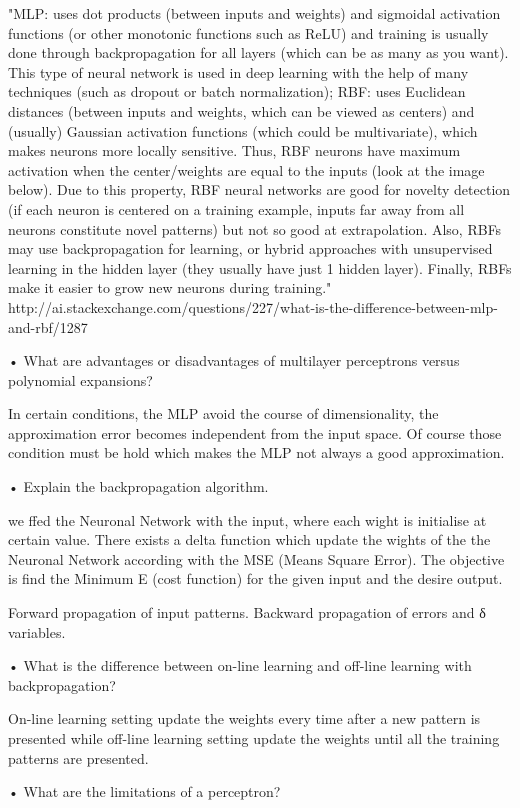 "MLP: uses dot products (between inputs and weights) and sigmoidal activation functions (or other monotonic functions such as ReLU) and training is usually done through backpropagation for all layers (which can be as many as you want). This type of neural network is used in deep learning with the help of many techniques (such as dropout or batch normalization);
RBF: uses Euclidean distances (between inputs and weights, which can be viewed as centers) and (usually) Gaussian activation functions (which could be multivariate), which makes neurons more locally sensitive. Thus, RBF neurons have maximum activation when the center/weights are equal to the inputs (look at the image below). Due to this property, RBF neural networks are good for novelty detection (if each neuron is centered on a training example, inputs far away from all neurons constitute novel patterns) but not so good at extrapolation. Also, RBFs may use backpropagation for learning, or hybrid approaches with unsupervised learning in the hidden layer (they usually have just 1 hidden layer). Finally, RBFs make it easier to grow new neurons during training." http://ai.stackexchange.com/questions/227/what-is-the-difference-between-mlp-and-rbf/1287

• What are advantages or disadvantages of multilayer perceptrons versus polynomial expansions?

In certain conditions, the MLP avoid the course of dimensionality, the approximation error becomes independent from the input space. Of course those condition must be hold which makes the MLP not always a good approximation.

• Explain the backpropagation algorithm.

we ffed the Neuronal Network with the input, where each wight is initialise at certain value. There exists a delta function which update the wights of the the Neuronal Network according with the MSE (Means Square Error). The objective is find the Minimum E (cost function) for the given input and the desire output.

Forward propagation of input patterns.
Backward propagation of errors and δ variables.


• What is the difference between on-line learning and off-line learning
with backpropagation?

On-line learning setting update the weights every time after a new pattern is presented while off-line learning setting update the weights until all the training patterns are presented.


• What are the limitations of a perceptron?

